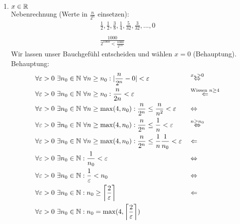 \begin{enumerate}[label=\arabic*)]
    \item $x \in \mathbb R$\\
    Nebenrechnung (Werte in $\frac{n}{2^n}$ einsetzen):
    \begin{align*}
        \frac{1}{2}, \frac{1}{2}, \frac{3}{8}, \frac{1}{4}, \frac{5}{32}, \frac{3}{32}, ..., 0\\
        \\
        \frac{1000}{2^{1000} < \frac{1000}{2^{125}}}
    \end{align*}
    Wir lassen unser Bauchgefühl entscheiden und wählen $x = 0$ (Behauptung).\\
    Behauptung:
    \begin{align*}
        &\forall \varepsilon > 0 \ \exists n_0 \in \mathbb N \ \forall n \geq n_0: |\frac{n}{2^n} - 0| < \varepsilon && \overset{x_n > 0}{\Leftrightarrow} \\
        &\forall \varepsilon > 0 \ \exists n_0 \in \mathbb N \ \forall n \geq n_0: \frac{n}{2n} < \varepsilon && \overset{\text{Wissen }n \geq 4}{\Leftarrow}\\
        &\forall \varepsilon > 0\ \exists n_0 \in \mathbb N \ \forall n \geq \max(4, n_0): \frac{n}{2^n} \leq \frac{n}{n^2} < \varepsilon && \Leftrightarrow\\
        &\forall \varepsilon > 0 \ \exists n_0 \in \mathbb N \ \forall n \geq \max(4, n_0): \frac{n}{2^n} \leq \frac{1}{n} < \varepsilon && \overset{n \geq n_0}{\Leftrightarrow}\\
        &\forall \varepsilon > 0 \ \exists n_0 \in \mathbb N \ \forall n \geq \max(4, n_0): \frac{n}{2^n} \leq \frac{1}{n} \frac{1}{n_0} < \varepsilon && \Leftarrow\\
        &\forall \varepsilon > 0 \ \exists n_0 \in \mathbb N: \frac{1}{n_0} < \varepsilon && \Leftrightarrow\\
        &\forall \varepsilon > 0 \ \exists n_0 \in \mathbb N: \frac{1}{\varepsilon} < n_0 && \Leftrightarrow\\
        &\forall \varepsilon > 0 \ \exists n_0 \in \mathbb N: n_0 \geq \left\lceil \frac{2}{\varepsilon}\right\rceil && \Leftarrow \\
        &\forall \varepsilon > 0 \ \exists n_0 \in \mathbb N: n_0 = \max({4, \left\lceil \frac{2}{\varepsilon}\right\rceil})
    \end{align*}
\end{enumerate}


